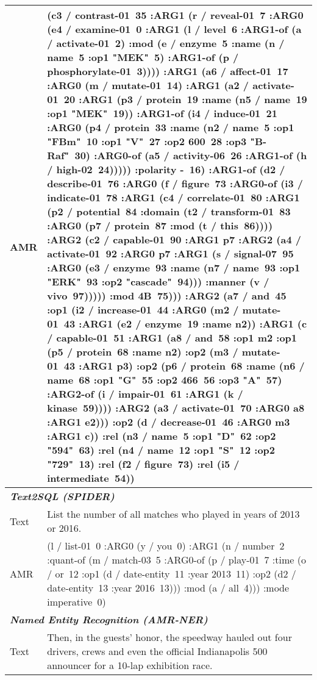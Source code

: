 \begin{enumerate}
{\begin{table}[ht]
\begin{tabular}{lp{6cm}}
\\
AMR & (c3 / contrast-01~35 :ARG1 (r / reveal-01~7 :ARG0 (e4 / examine-01~0 :ARG1 (l / level~6 :ARG1-of (a / activate-01~2) :mod (e / enzyme~5 :name (n / name~5 :op1 "MEK"~5) :ARG1-of (p / phosphorylate-01~3)))) :ARG1 (a6 / affect-01~17 :ARG0 (m / mutate-01~14) :ARG1 (a2 / activate-01~20 :ARG1 (p3 / protein~19 :name (n5 / name~19 :op1 "MEK"~19)) :ARG1-of (i4 / induce-01~21 :ARG0 (p4 / protein~33 :name (n2 / name~5 :op1 "FBm"~10 :op1 "V"~27 :op2 600~28 :op3 "B-Raf"~30) :ARG0-of (a5 / activity-06~26 :ARG1-of (h / high-02~24))))) :polarity -~16) :ARG1-of (d2 / describe-01~76 :ARG0 (f / figure~73 :ARG0-of (i3 / indicate-01~78 :ARG1 (c4 / correlate-01~80 :ARG1 (p2 / potential~84 :domain (t2 / transform-01~83 :ARG0 (p7 / protein~87 :mod (t / this~86)))) :ARG2 (c2 / capable-01~90 :ARG1 p7 :ARG2 (a4 / activate-01~92 :ARG0 p7 :ARG1 (s / signal-07~95 :ARG0 (e3 / enzyme~93 :name (n7 / name~93 :op1 "ERK"~93 :op2 "cascade"~94))) :manner (v / vivo~97))))) :mod 4B~75))) :ARG2 (a7 / and~45 :op1 (i2 / increase-01~44 :ARG0 (m2 / mutate-01~43 :ARG1 (e2 / enzyme~19 :name n2)) :ARG1 (c / capable-01~51 :ARG1 (a8 / and~58 :op1 m2 :op1 (p5 / protein~68 :name n2) :op2 (m3 / mutate-01~43 :ARG1 p3) :op2 (p6 / protein~68 :name (n6 / name~68 :op1 "G"~55 :op2 466~56 :op3 "A"~57) :ARG2-of (i / impair-01~61 :ARG1 (k / kinase~59)))) :ARG2 (a3 / activate-01~70 :ARG0 a8 :ARG1 e2))) :op2 (d / decrease-01~46 :ARG0 m3 :ARG1 c)) :rel (n3 / name~5 :op1 "D"~62 :op2 "594"~63) :rel (n4 / name~12 :op1 "S"~12 :op2 "729"~13) :rel (f2 / figure~73) :rel (i5 / intermediate~54)) 
\\
\midrule
\multicolumn{2}{l}{\textbf{\textit{Text2SQL (SPIDER)}}}\\
Text & List the number of all matches who played in years of 2013 or 2016.
\\
AMR & (l / list-01~0     :ARG0 (y / you~0)     :ARG1 (n / number~2         :quant-of (m / match-03~5             :ARG0-of (p / play-01~7                 :time (o / or~12                     :op1 (d / date-entity~11                         :year 2013~11)                     :op2 (d2 / date-entity~13                         :year 2016~13)))             :mod (a / all~4)))     :mode imperative~0)
\\
\midrule
\multicolumn{2}{l}{\textbf{\textit{Named Entity Recognition (AMR-NER)}}}\\
Text & Then, in the guests' honor, the speedway hauled out four drivers, crews and even the official Indianapolis 500 announcer for a 10-lap exhibition race.
\\

\end{tabular}
\end{table}}
\end{enumerate}
